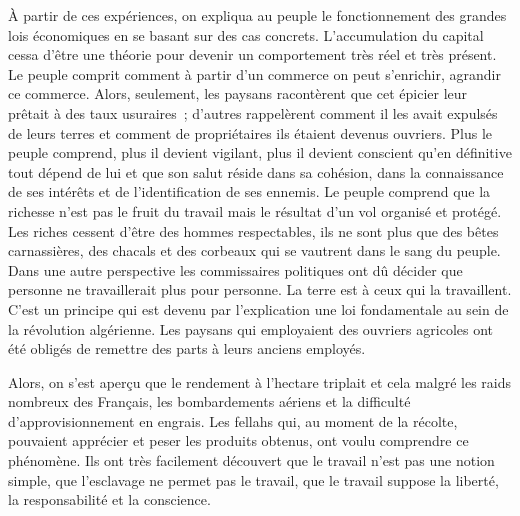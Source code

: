 \documentclass[french,twoside]{book} %
\begin{document}
À partir de ces expériences, on expliqua au peuple le fonctionnement des grandes lois économiques en se basant sur des cas concrets. L’accumulation du capital cessa d’être une théorie pour devenir un comportement très réel et très présent. Le peuple comprit comment à partir d’un commerce on peut   s’enrichir, agrandir ce commerce. Alors, seulement, les paysans racontèrent que cet épicier leur prêtait à des taux usuraires ; d’autres rappelèrent comment il les avait expulsés de leurs terres et comment de propriétaires ils étaient devenus ouvriers. Plus le peuple comprend, plus il devient vigilant, plus il devient conscient qu’en définitive tout dépend de lui et que son salut réside dans sa cohésion, dans la connaissance de ses intérêts et de l’identification de ses ennemis. Le peuple comprend que la richesse n’est pas le fruit du travail mais le résultat d’un vol organisé et protégé. Les riches cessent d’être des hommes respectables, ils ne sont plus que des bêtes carnassières, des chacals et des corbeaux qui se vautrent dans le sang du peuple. Dans une autre perspective les commissaires politiques ont dû décider que personne ne travaillerait plus pour personne. La terre est à ceux qui la travaillent. C’est un principe qui est devenu par l’explication une loi fondamentale au sein de la révolution algérienne. Les paysans qui employaient des ouvriers agricoles ont été obligés de remettre des parts à leurs anciens employés.\par
Alors, on s’est aperçu que le rendement à l’hectare triplait et cela malgré les raids nombreux des Français, les bombardements aériens et la difficulté d’approvisionnement en engrais. Les fellahs qui, au moment de la récolte, pouvaient apprécier et peser les produits obtenus, ont voulu comprendre ce phénomène. Ils ont très facilement découvert que le travail n’est pas une notion simple, que l’esclavage ne permet pas le travail, que le travail suppose la liberté, la responsabilité et la conscience.\par
\bigbreak
\end{document}
